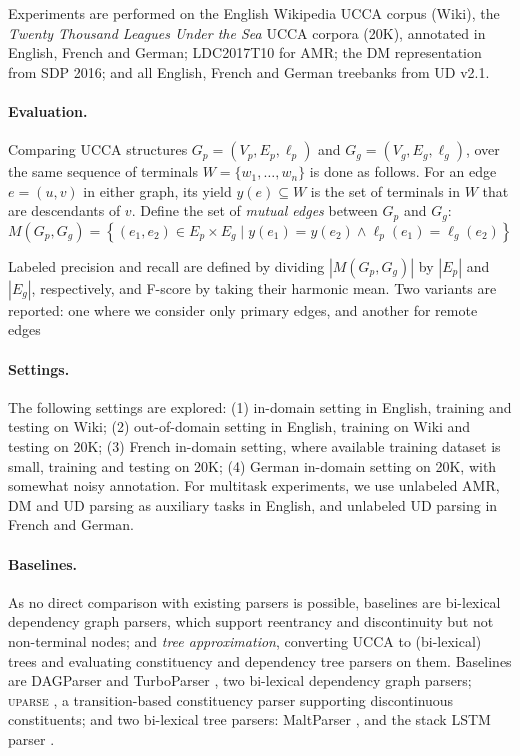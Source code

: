 \documentclass[12pt]{report}
\begin{document}
Experiments are performed on the English Wikipedia UCCA corpus (Wiki),
the \textit{Twenty Thousand Leagues Under the Sea} UCCA corpora (20K),
annotated in English, French and German;
LDC2017T10 for AMR;
the DM representation from SDP 2016;
and all English, French and German treebanks from UD v2.1.


\paragraph{Evaluation.}
Comparing UCCA structures
$G_p=(V_p,E_p,\ell_p)$ and $G_g=(V_g,E_g,\ell_g)$,
over the same sequence of terminals $W = \{w_1,\ldots,w_n\}$
is done as follows.
For an edge $e=(u,v)$ in either graph, its yield $y(e) \subseteq W$ is the
set of terminals in $W$ that are descendants of $v$.
Define the set of \textit{mutual edges} between $G_p$ and $G_g$:
\[
    M(G_p,G_g) =
    \left\{(e_1,e_2) \in E_p \times E_g \;|\;
    y(e_1) = y(e_2) \wedge \ell_p(e_1)=\ell_g(e_2)\right\}
\]

Labeled precision and recall are defined by dividing $|M(G_p,G_g)|$ by $|E_p|$ and $|E_g|$, respectively,
and F-score by taking their harmonic mean.
Two variants are reported: one where we consider only primary edges,
and another for remote edges


\paragraph{Settings.}

The following settings are explored:
(1) in-domain setting in English, training and testing on Wiki;
(2) out-of-domain setting in English, training on Wiki and testing on 20K;
(3) French in-domain setting, where available training dataset is small,
training and testing on 20K;
(4) German in-domain setting on 20K, with somewhat noisy annotation.
For multitask experiments, we use unlabeled AMR, DM and UD parsing as auxiliary tasks in English,
and unlabeled UD parsing in French and German.

\paragraph{Baselines.}
As no direct comparison with existing parsers is possible,
baselines are bi-lexical dependency graph parsers,
which support reentrancy and discontinuity but not non-terminal nodes;
and \textit{tree approximation}, converting UCCA to (bi-lexical) trees
and evaluating constituency and dependency tree parsers on them.
Baselines are DAGParser \citep{ribeyre-villemontedelaclergerie-seddah:2014:SemEval} and
TurboParser \citep{almeida-martins:2015:SemEval},
two bi-lexical dependency graph parsers;
\textsc{uparse} \citep{maier-lichte:2016:DiscoNLP},
a transition-based constituency parser supporting discontinuous constituents;
and two bi-lexical tree parsers:
MaltParser \citep{nivre2007maltparser},
and the stack LSTM parser \citep{dyer2015transition}.
\end{document}
